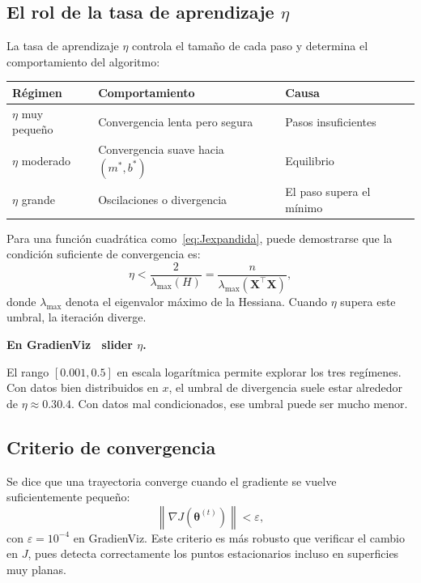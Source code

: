 \documentclass[12pt, a4paper]{article}
\newenvironment{viznota}[1]{%
  \begin{mdframed}[style=vizverde]
  \textbf{\color{bordeteo}En GradienViz \textemdash\ #1.}\quad
}{%
  \end{mdframed}
}
\newcommand{\norm}[1]{\left\lVert #1 \right\rVert}
\newcommand{\grad}{\nabla}
\newcommand{\mstar}{m^{*}}
\newcommand{\bstar}{b^{*}}
\newcommand{\XtX}{\mathbf{X}^{\top}\mathbf{X}}
\begin{document}
\subsection{El rol de la tasa de aprendizaje \texorpdfstring{$\eta$}{eta}}

La tasa de aprendizaje $\eta$ controla el tamaño de cada paso y determina
el comportamiento del algoritmo:

\begin{center}
\begin{tabular}{lll}
  \toprule
  Régimen & Comportamiento & Causa \\
  \midrule
  $\eta$ muy pequeño & Convergencia lenta pero segura & Pasos insuficientes \\
  $\eta$ moderado    & Convergencia suave hacia $(\mstar,\bstar)$ & Equilibrio \\
  $\eta$ grande      & Oscilaciones o divergencia & El paso supera el mínimo \\
  \bottomrule
\end{tabular}
\end{center}

Para una función cuadrática como~\eqref{eq:Jexpandida}, puede demostrarse que
la condición suficiente de convergencia es:
\begin{equation}\label{eq:condeta}
  \eta < \frac{2}{\lambda_{\max}(H)} = \frac{n}{\lambda_{\max}(\XtX)},
\end{equation}
donde $\lambda_{\max}$ denota el eigenvalor máximo de la Hessiana.
Cuando $\eta$ supera este umbral, la iteración diverge.

\begin{viznota}{slider $\eta$}
El rango $[0.001, 0.5]$ en escala logarítmica permite explorar
los tres regímenes. Con datos bien distribuidos en $x$, el umbral
de divergencia suele estar alrededor de $\eta \approx 0.3$\textendash$0.4$.
Con datos mal condicionados, ese umbral puede ser mucho menor.
\end{viznota}

\subsection{Criterio de convergencia}

Se dice que una trayectoria converge cuando el gradiente se vuelve
suficientemente pequeño:
\[
  \norm{\grad J\!\left(\boldsymbol{\theta}^{(t)}\right)} < \varepsilon,
\]
con $\varepsilon = 10^{-4}$ en GradienViz. Este criterio es más robusto que
verificar el cambio en $J$, pues detecta correctamente los puntos estacionarios
incluso en superficies muy planas.
\end{document}
